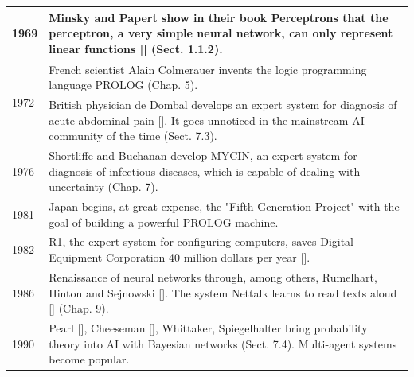 \documentclass[10pt]{book}
\begin{document}
\begin{center}
\begin{tabular}{|l|l|}
\hline
1969 & Minsky and Papert show in their book Perceptrons that the perceptron, a very simple neural network, can only represent linear functions [\cite{mp69}] (Sect. 1.1.2). \\
\hline
\multirow[t]{2}{*}{1972} & French scientist Alain Colmerauer invents the logic programming language PROLOG (Chap. 5). \\
 & British physician de Dombal develops an expert system for diagnosis of acute abdominal pain [\cite{ddls72}]. It goes unnoticed in the mainstream AI community of the time (Sect. 7.3). \\
\hline
1976 & Shortliffe and Buchanan develop MYCIN, an expert system for diagnosis of infectious diseases, which is capable of dealing with uncertainty (Chap. 7). \\
\hline
1981 & Japan begins, at great expense, the "Fifth Generation Project" with the goal of building a powerful PROLOG machine. \\
\hline
1982 & R1, the expert system for configuring computers, saves Digital Equipment Corporation 40 million dollars per year [\cite{mcd82}]. \\
\hline
1986 & Renaissance of neural networks through, among others, Rumelhart, Hinton and Sejnowski [\cite{rm86}]. The system Nettalk learns to read texts aloud [\cite{sr86}] (Chap. 9). \\
\hline
1990 & Pearl [\cite{pea88}], Cheeseman [\cite{che85}], Whittaker, Spiegelhalter bring probability theory into AI with Bayesian networks (Sect. 7.4). Multi-agent systems become popular. \\
\hline
\end{tabular}
\end{center}
\end{document}

